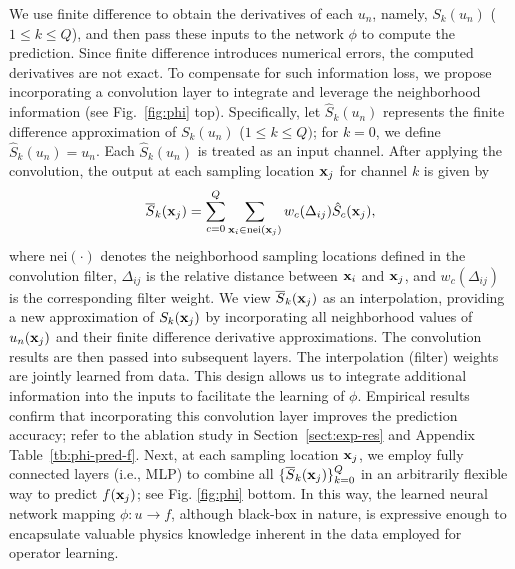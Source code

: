 We use finite difference to obtain the derivatives of each $u_n$, namely, $S_k(u_n)$ ($1 \le k \le Q$), and then pass these inputs to the  network $\phi$ to compute the prediction. Since finite difference introduces numerical errors, the computed derivatives are not exact. To compensate for such information loss, we propose incorporating a convolution layer to integrate and leverage the neighborhood information (see Fig.~\ref{fig:phi} top). Specifically, let $\hat{S}_k(u_n)$ represents the finite difference approximation of $S_k(u_n)$ ($1 \le k \le Q)$; for $k=0$, we define $\hat{S}_k(u_n) = u_n$. Each $\hat{S}_k(u_n)$ is treated as an input channel. After applying the convolution,  the output at each sampling location ${\bf x}_j$ for channel $k$ is given by
\begin{align}
    \overline{S}_k({\bf x}_j) = \sum_{c=0}^{Q} \sum_{{\bf x}_i \in \text{nei}({\bf x}_j)} w_c(\Delta_{ij}) \hat{S}_c({\bf x}_j),
\end{align}
where $\text{nei}(\cdot)$ denotes the neighborhood sampling locations defined in the convolution filter, $\Delta_{ij}$ is the relative distance between ${\bf x}_i$ and ${\bf x}_j$, and $w_c(\Delta_{ij})$ is the corresponding filter weight. We view $\overline{S}_k({\bf x}_j)$ as an interpolation, providing a new approximation of $S_k({\bf x}_j)$ by incorporating all neighborhood values of $u_n({\bf x}_j)$ and their finite difference derivative approximations. The convolution results are then passed into subsequent layers. The interpolation (filter) weights are jointly learned from data. This design allows us to integrate additional information into the inputs to facilitate the learning of $\phi$. Empirical results confirm that incorporating this convolution layer improves the prediction accuracy; refer to the ablation study in Section~\ref{sect:exp-res} and Appendix Table~\ref{tb:phi-pred-f}. Next, at each sampling location ${\bf x}_j$, we employ fully connected layers (i.e., MLP) to combine all $\{\overline{S}_k({\bf x}_j)\}_{k=0}^Q$ in an arbitrarily flexible way to predict $f({\bf x}_j)$; see Fig. \ref{fig:phi} bottom. In this way, the learned neural network mapping $\phi: u \rightarrow f$, although black-box in nature, is expressive enough to encapsulate valuable physics knowledge inherent in the data employed for operator learning. 





